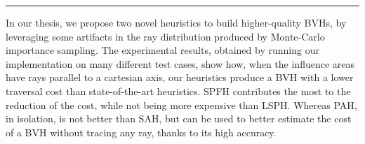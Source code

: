 \documentclass[11pt,a4paper,twocolumn]{article}
\begin{document}
\rule{0.471\textwidth}{0.5pt}

In our thesis, we propose two novel heuristics to build higher-quality BVHs, by leveraging some artifacts in the ray distribution produced by Monte-Carlo importance sampling. The experimental results, obtained by running our implementation on many different test cases, show how, when the influence areas have rays parallel to a cartesian axis, our heuristics produce a BVH with a lower traversal cost than state-of-the-art heuristics. SPFH contributes the most to the reduction of the cost, while not being more expensive than LSPH. Whereas PAH, in isolation, is not better than SAH, but can be used to better estimate the cost of a BVH without tracing any ray, thanks to its high accuracy.
\end{document}
